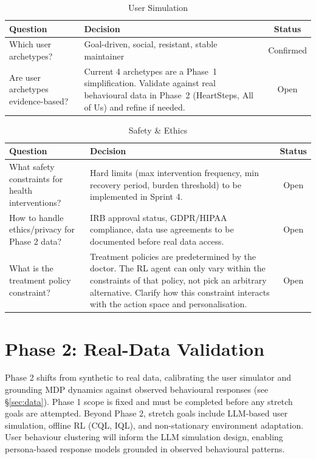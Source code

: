 \documentclass[11pt,a4paper]{article}
\begin{document}
\begin{table}[H]
\centering
\caption{User Simulation}
\begin{tabular}{p{}p{}c}
\toprule
Question & Decision & Status \\
\midrule
Which user archetypes? & Goal-driven, social, resistant, stable maintainer & Confirmed \\
\midrule
Are user archetypes evidence-based? & Current 4 archetypes are a Phase~1 simplification. Validate against real behavioural data in Phase~2 (HeartSteps, All of Us) and refine if needed. & Open \\
\bottomrule
\end{tabular}
\end{table}

\begin{table}[H]
\centering
\caption{Safety \& Ethics}
\begin{tabular}{p{}p{}c}
\toprule
Question & Decision & Status \\
\midrule
What safety constraints for health interventions? & Hard limits (max intervention frequency, min recovery period, burden threshold) to be implemented in Sprint 4. & Open \\
How to handle ethics/privacy for Phase 2 data? & IRB approval status, GDPR/HIPAA compliance, data use agreements to be documented before real data access. & Open \\
What is the treatment policy constraint? & Treatment policies are predetermined by the doctor. The RL agent can only vary within the constraints of that policy, not pick an arbitrary alternative. Clarify how this constraint interacts with the action space and personalisation. & Open \\
\bottomrule
\end{tabular}
\end{table}

\section{Phase 2: Real-Data Validation}

Phase 2 shifts from synthetic to real data, calibrating the user simulator
and grounding MDP dynamics against observed behavioural responses (see
\S\ref{sec:data}). Phase 1 scope is fixed and must be completed before any stretch goals are attempted. Beyond Phase 2, stretch goals include LLM-based user
simulation, offline RL (CQL, IQL), and non-stationary environment
adaptation. User behaviour clustering will inform the LLM simulation design,
enabling persona-based response models grounded in observed behavioural patterns.
\end{document}
